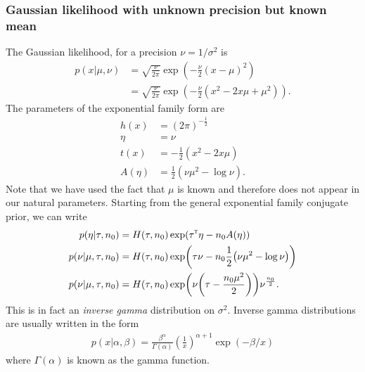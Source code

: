 \documentclass[a4paper]{article}
\theoremstyle{definition}
\begin{document}
\subsubsection{Gaussian likelihood with unknown precision but known mean}
The Gaussian likelihood, for a precision $\nu=1/\sigma^2$ is
\begin{align}
p(x|\mu,\nu) &= \sqrt{\frac{ \nu }{ 2\pi }} \exp\left(- \frac{ \nu }{ 2 } \left( x - \mu \right)^2 \right) \\
&= \sqrt{\frac{ \nu }{ 2\pi }} \exp\left(- \frac{ \nu }{ 2 } \left( x^2 - 2 x\mu + \mu^2 \right) \right). 
\end{align}
The parameters of the exponential family form are
\begin{align}
h(x) &= (2\pi)^{-\frac{1}{2}} \\
\eta &= \nu\\
t(x) &= -\frac{ 1 }{ 2 }\left( x^2 - 2x\mu \right)\\
A( \eta ) &=\frac{1}{2}\left( \nu\mu^2 - \log\nu\right).
\end{align}
Note that we have used the fact that $\mu$ is known and therefore does not appear in our natural parameters. Starting from the general exponential family conjugate prior, we can write
\begin{align}
p(\eta | \tau, n_0) &= H( \tau, n_0 ) \exp\left( \tau\transpose \eta - n_0 A(\eta) \right) \\
p(\nu | \mu, \tau, n_0)  &= H( \tau, n_0 ) \exp\left( \tau\nu - n_0 \frac{1}{2}\left( \nu\mu^2 - \log\nu\right) \right) \\
p(\nu | \mu, \tau, n_0)  &= H( \tau, n_0 ) \exp\left(\nu \left( \tau -  \frac{n_0 \mu^2}{2} \right)\right) \nu^{ \frac{ n_0 }{ 2 } }. 
\end{align}
This is in fact an \emph{inverse gamma} distribution on $\sigma^2$. Inverse gamma distributions are usually written in the form
\begin{align}
p(x | \alpha,\beta)=\frac{\beta^\alpha}{\Gamma(\alpha)}\left(\frac{1}{x}\right)^{\alpha + 1} \exp \left(-\beta / x \right)
\end{align}
where $\Gamma(\alpha)$ is known as the gamma function.
\end{document}
